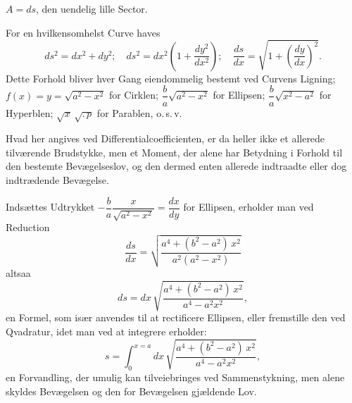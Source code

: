 \documentclass[12pt]{book}
\newcommand{\opage}[1]{\marginnote{\footnotesize\textit{[#1]}}}
\begin{document}
\begin{center}

$A = ds$, den uendelig lille Sector.
\end{center}

For en hvilkensomhelst Curve haves
\[
ds^{2} = dx^{2} + dy^{2}; \quad
ds^{2} = dx^{2}\left(1 + \frac{dy^{2}}{dx^{2}}\right); \quad
\frac{ds}{dx} = \sqrt{1 + \left(\frac{dy}{dx}\right)^{2}}.
\]
Dette Forhold bliver hver Gang eiendommelig bestemt ved Curvens
Ligning; $f(x) = y = \sqrt{a^{2}-x^{2}}$ for Cirklen;
$\dfrac{b}{a}\sqrt{a^{2}-x^{2}}$ for Ellipsen;
$\dfrac{b}{a}\sqrt{x^{2}-a^{2}}$ for Hyperblen;
$\sqrt{x}\,\sqrt{.\,p}$ for Parablen\footnotemark, o.\,s.\,v.

Hvad her angives ved Differentialcoefficienten, er da heller ikke et
allerede tilværende Brudstykke, men et Moment, der alene har Betydning
i Forhold til den bestemte Bevægelseslov, og den dermed enten allerede
indtraadte eller dog indtrædende Bevægelse.

Indsættes Udtrykket
$-\dfrac{b}{a}\dfrac{x}{\sqrt{a^{2}-x^{2}}} = \dfrac{dx}{dy}$ for
Ellipsen, erholder man ved Reduction
\[
\frac{ds}{dx} = \sqrt{\frac{a^{4} + (b^{2}-a^{2})\,x^{2}}
  {a^{2}(a^{2}-x^{2})}}
\]
\opage{78} altsaa
\[
ds = dx\,\sqrt{\frac{a^{4} + (b^{2}-a^{2})\,x^{2}}{a^{4}-a^{2}x^{2}}},
\]
en Formel, som især anvendes til at rectificere Ellipsen, eller
fremstille den ved Qvadratur\footnotemark, idet man ved at integrere
erholder:
\[
s = \int_{0}^{x=a} dx\,\sqrt{\frac{a^{4} + (b^{2}-a^{2})\,x^{2}}
  {a^{4}-a^{2}x^{2}}},
\]
en Forvandling, der umulig kan tilveiebringes ved Sammenstykning, men
alene skyldes Bevægelsen og den for Bevægelsen gjældende Lov.
\end{document}
